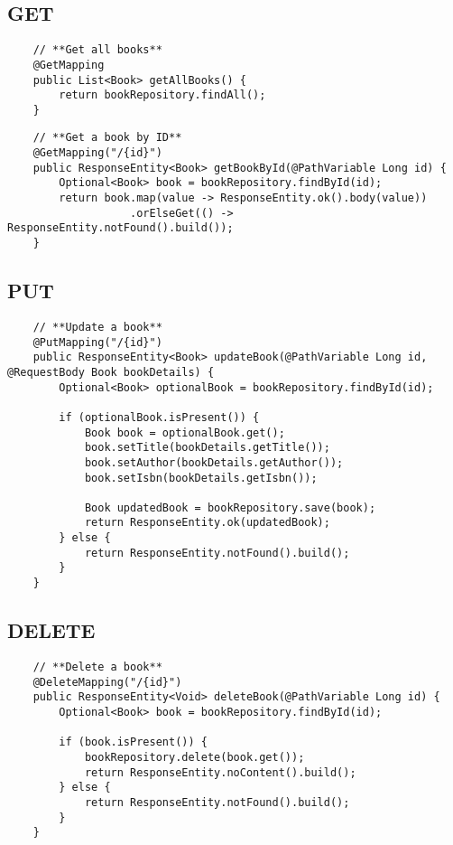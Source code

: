 \documentclass[a4paper, 12pt]{article}
\begin{document}
    \subsection{GET}
    \begin{lstlisting}
    // **Get all books**
    @GetMapping
    public List<Book> getAllBooks() {
        return bookRepository.findAll();
    }
    \end{lstlisting}

    \begin{lstlisting}
    // **Get a book by ID**
    @GetMapping("/{id}")
    public ResponseEntity<Book> getBookById(@PathVariable Long id) {
        Optional<Book> book = bookRepository.findById(id);
        return book.map(value -> ResponseEntity.ok().body(value))
                   .orElseGet(() -> ResponseEntity.notFound().build());
    }
    \end{lstlisting}

    \subsection{PUT}
    \begin{lstlisting}
    // **Update a book**
    @PutMapping("/{id}")
    public ResponseEntity<Book> updateBook(@PathVariable Long id, @RequestBody Book bookDetails) {
        Optional<Book> optionalBook = bookRepository.findById(id);

        if (optionalBook.isPresent()) {
            Book book = optionalBook.get();
            book.setTitle(bookDetails.getTitle());
            book.setAuthor(bookDetails.getAuthor());
            book.setIsbn(bookDetails.getIsbn());

            Book updatedBook = bookRepository.save(book);
            return ResponseEntity.ok(updatedBook);
        } else {
            return ResponseEntity.notFound().build();
        }
    }
    \end{lstlisting}

    \subsection{DELETE}
    \begin{lstlisting}
    // **Delete a book**
    @DeleteMapping("/{id}")
    public ResponseEntity<Void> deleteBook(@PathVariable Long id) {
        Optional<Book> book = bookRepository.findById(id);

        if (book.isPresent()) {
            bookRepository.delete(book.get());
            return ResponseEntity.noContent().build();
        } else {
            return ResponseEntity.notFound().build();
        }
    }
    \end{lstlisting}
\end{document}
